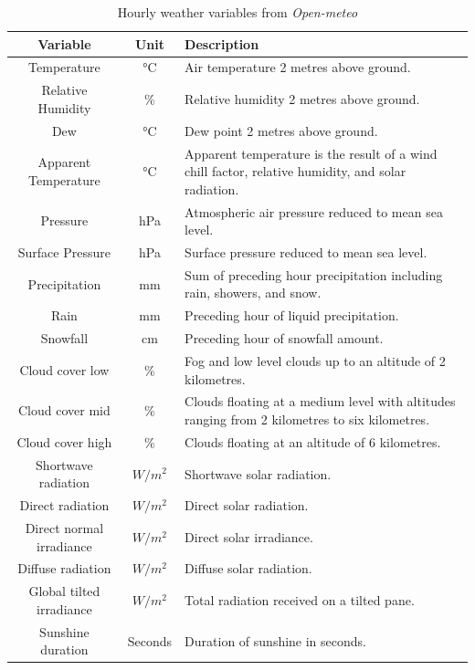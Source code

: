 \begin{table}[H]
	\caption{Hourly weather variables from \textit{Open-meteo}}
	\centering
	\small
	\label{open_meteo_variables}
	\begin{tabular}{ccp{10cm}} %
		\hline
		\textbf{Variable} & \textbf{Unit} & \textbf{Description}\\
		\hline
		Temperature & °C & Air temperature 2 metres above ground. \\
		\hline
		Relative Humidity & \% & Relative humidity 2 metres above ground. \\
		\hline
		Dew & °C & Dew point 2 metres above ground. \\
		\hline
		Apparent Temperature & °C & Apparent temperature is the 
		result of a wind chill factor, relative humidity, and solar radiation. \\
		\hline
		Pressure & hPa & Atmospheric air pressure reduced to mean sea level. \\
		\hline
		Surface Pressure & hPa & Surface pressure reduced to mean sea level. \\
		\hline
		Precipitation & mm & Sum of preceding hour precipitation including rain, showers, and snow. \\
		\hline
		Rain & mm & Preceding hour of liquid precipitation. \\
		\hline
		Snowfall & cm & Preceding hour of snowfall amount. \\
		\hline
		Cloud cover low & \% & Fog and low level clouds up to an altitude of 2 kilometres. \\
		\hline
		Cloud cover mid & \% & Clouds floating at a medium level with altitudes ranging from 2 kilometres to six kilometres. \\
		\hline
		Cloud cover high & \% & Clouds floating at an altitude of 6 kilometres. \\
		\hline
		Shortwave radiation & $W/m^2$ & Shortwave solar radiation.  \\
		\hline
		Direct radiation & $W/m^2$ & Direct solar radiation. \\
		\hline
		Direct normal irradiance & $W/m^2$ & Direct solar irradiance.  \\
		\hline
		Diffuse radiation & $W/m^2$ & Diffuse solar radiation.  \\
		\hline
		Global tilted irradiance & $W/m^2$ & Total radiation received on a tilted pane.  \\
		\hline
		Sunshine duration & Seconds & Duration of sunshine in seconds.  \\

\end{tabular}
\end{table}
